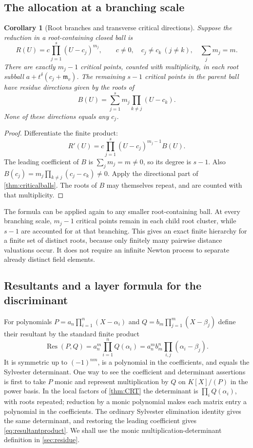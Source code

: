 \documentclass[11pt,letterpaper]{article}
\numberwithin{equation}{section}
\newtheorem{corollary}[corollary]{Corollary}
\theoremstyle{definition}
\theoremstyle{remark}
\newcommand{\mv}{\mathfrak m_v}
\newcommand{\Res}{\operatorname{Res}}
\begin{document}
\subsection{The allocation at a branching scale}
\begin{corollary}[Root branches and transverse critical directions]\label{cor:branchcritical}
Suppose the reduction in a root-containing closed ball is
\[
 R(U)=c\prod_{j=1}^s(U-c_j)^{m_j},\qquad
 c\ne0,\quad c_j\ne c_k\ (j\ne k),\quad \sum_jm_j=m.
\]
There are exactly $m_j-1$ critical points, counted with multiplicity, in
each root subball $a+t^\delta(c_j+\mv)$. The remaining $s-1$ critical
points in the parent ball have residue directions given by the roots of
\begin{equation}\label{eq:branchpoly}
 B(U)=\sum_{j=1}^s m_j\prod_{k\ne j}(U-c_k).
\end{equation}
None of these directions equals any $c_j$.
\end{corollary}
\begin{proof}
Differentiate the finite product:
\[
 R'(U)=c\prod_{j=1}^s(U-c_j)^{m_j-1}B(U).
\]
The leading coefficient of $B$ is $\sum_jm_j=m\ne0$, so its degree is
$s-1$. Also
$B(c_j)=m_j\prod_{k\ne j}(c_j-c_k)\ne0$.
Apply the directional part of \cref{thm:criticalballs}. The roots of $B$
may themselves repeat, and are counted with that multiplicity.
\end{proof}

The formula can be applied again to any smaller root-containing ball.
At every branching scale, $m_j-1$ critical points remain in each child
root cluster, while $s-1$ are accounted for at that branching. This gives
an exact finite hierarchy for a finite set of distinct roots, because
only finitely many pairwise distance valuations occur. It does not require
an infinite Newton process to separate already distinct field elements.

\subsection{Resultants and a layer formula for the discriminant}
For polynomials $P=a_n\prod_{i=1}^n(X-\alpha_i)$ and
$Q=b_m\prod_{j=1}^m(X-\beta_j)$ define their resultant by the standard
finite product
\begin{equation}\label{eq:resultantproduct}
 \Res(P,Q)=a_n^m\prod_{i=1}^nQ(\alpha_i)
 =a_n^m b_m^n\prod_{i,j}(\alpha_i-\beta_j).
\end{equation}
It is symmetric up to $(-1)^{nm}$, is a polynomial in the coefficients,
and equals the Sylvester determinant. One way to see the coefficient and
determinant assertions is first to take $P$ monic and represent
multiplication by $Q$ on $K[X]/(P)$ in the power basis. In the local
factors of \cref{thm:CRT} the determinant is
$\prod_iQ(\alpha_i)$, with roots repeated; reduction by a monic polynomial
makes each matrix entry a polynomial in the coefficients. The ordinary
Sylvester elimination identity gives the same determinant, and restoring
the leading coefficient gives \eqref{eq:resultantproduct}. We shall use
the monic multiplication-determinant definition in \cref{sec:residue}.
\end{document}
